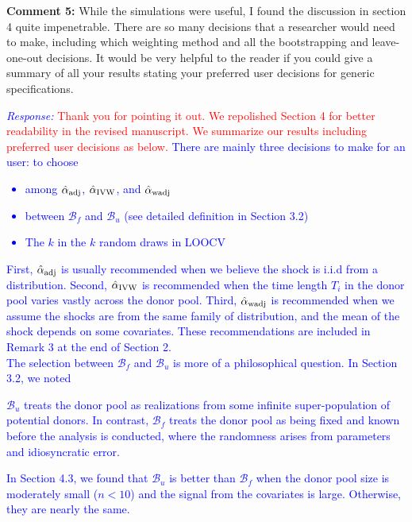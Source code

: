 \documentclass[12pt]{article}
\newcommand{\response}[1]{\noindent \textcolor{blue}{\emph{Response:} #1}}
\begin{document}
{\bf Comment 5:} While the simulations were useful, I found the discussion in section 4 quite impenetrable. There are so many decisions that a researcher would need to make, including which weighting method and all the bootstrapping and leave-one-out decisions. It would be very helpful to the reader if you could give a summary of all your results stating your preferred user decisions for generic specifications. \\

\response{\textcolor{red}{Thank you for pointing it out. We repolished Section 4 for better readability in the revised manuscript.} \textcolor{red}{We  summarize  our results including preferred user decisions as below. }There are mainly three decisions to make for an user: to choose 
  \begin{itemize}
    \item among  $\hat{\alpha}_{\rm adj}$, $\hat{\alpha}_{\rm IVW}$, and $\hat{\alpha}_{\rm wadj}$ 
    \item between $\mathcal{B}_f$ and $\mathcal{B}_u$ (see detailed definition in Section 3.2)
    \item The $k$ in the $k$ random draws in LOOCV
  \end{itemize}
  First, $\hat{\alpha}_{\rm adj}$ is usually recommended when we believe the shock is i.i.d from a distribution. Second, $\hat{\alpha}_{\rm IVW}$ is recommended when the time length $T_i$ in the donor pool varies vastly across the donor pool. Third, $\hat{\alpha}_{\rm wadj}$  is recommended when we assume the shocks are from the same family of distribution, and the mean of the shock depends on some covariates. These recommendations are included in Remark 3 at the end of Section 2. \\
  
  The selection between $\mathcal{B}_f$ and $\mathcal{B}_u$ is more of a philosophical question. In Section 3.2,  we noted
  
  \begin{tcolorbox}
  $\mathcal{B}_u$ treats the donor pool as realizations from some infinite super-population of potential donors. In contrast, $\mathcal{B}_f$ treats the donor pool as being fixed  and known before the analysis is conducted, where the randomness arises from parameters and idiosyncratic error.   
  \end{tcolorbox}

In Section 4.3, we found that $\mathcal{B}_u$ is better than $\mathcal{B}_f$ when  the donor pool size is moderately small ($n< 10$) and the signal from the covariates is large. Otherwise, they are nearly the same. \\


}
\end{document}
